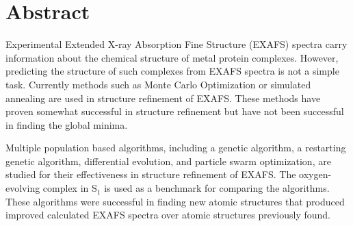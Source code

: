 \thispagestyle{empty}
\section*{Abstract}
\begin{doublespace}
Experimental Extended X-ray Absorption Fine Structure (EXAFS) spectra carry information about the chemical structure of metal protein complexes. However, predicting the structure of such complexes from EXAFS spectra is not a simple task. Currently methods such as Monte Carlo Optimization or simulated annealing are used in structure refinement of EXAFS. These methods have proven somewhat successful in structure refinement but have not been successful in finding the global minima.

Multiple population based algorithms, including a genetic algorithm, a restarting genetic algorithm, differential evolution, and particle swarm optimization, are studied for their effectiveness in structure refinement of EXAFS. The oxygen-evolving complex in S$_{1}$ is used as a benchmark for comparing the algorithms. These algorithms were successful in finding new atomic structures that produced improved calculated EXAFS spectra over atomic structures previously found.

\end{doublespace}   

